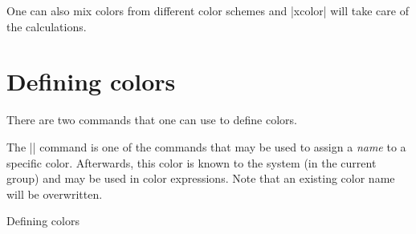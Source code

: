 \documentclass{article}
\begin{document}
One can also mix colors from different color schemes and |xcolor| will take care of the calculations.

\section{Defining colors}

There are two commands that one can use to define colors.

\begin{macro}{\definecolor} 
The |\definecolor| command is one of the commands that may be used to assign a \textit{name} to a specific color. Afterwards, this color is known to the system (in the current group) and may be used in color expressions. Note that an existing color name will be overwritten.
\end{macro} 

\begin{texexample}{Defining colors}{}

\color{myblack}\lorem
\end{texexample}
\end{document}
